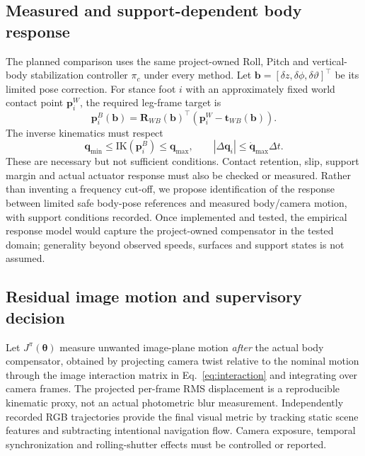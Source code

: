 \subsection{Measured and support-dependent body response}
The planned comparison uses the same project-owned Roll, Pitch and vertical-body stabilization controller $\pi_c$ under every method. Let $\bm b=[\delta z,\delta\phi,\delta\vartheta]^\top$ be its limited pose correction. For stance foot $i$ with an approximately fixed world contact point $\bm p_i^W$, the required leg-frame target is
\begin{equation}\label{eq:stanceanchor}
\bm p_i^B(\bm b)=\bm R_{WB}(\bm b)^\top(\bm p_i^W-\bm t_{WB}(\bm b)).
\end{equation}
The inverse kinematics must respect
\begin{equation}\label{eq:limits}
\bm q_{\min}\le\mathrm{IK}(\bm p_i^B)\le\bm q_{\max},\qquad
|\Delta\bm q_i|\le\dot{\bm q}_{\max}\Delta t.
\end{equation}
These are necessary but not sufficient conditions. Contact retention, slip, support margin and actual actuator response must also be checked or measured. Rather than inventing a frequency cut-off, we propose identification of the response between limited safe body-pose references and measured body/camera motion, with support conditions recorded. Once implemented and tested, the empirical response model would capture the project-owned compensator in the tested domain; generality beyond observed speeds, surfaces and support states is not assumed.

\subsection{Residual image motion and supervisory decision}
Let $J^\pi(\bm\theta)$ measure unwanted image-plane motion \emph{after} the actual body compensator, obtained by projecting camera twist relative to the nominal motion through the image interaction matrix in Eq.~\eqref{eq:interaction} and integrating over camera frames. The projected per-frame RMS displacement is a reproducible kinematic proxy, not an actual photometric blur measurement. Independently recorded RGB trajectories provide the final visual metric by tracking static scene features and subtracting intentional navigation flow. Camera exposure, temporal synchronization and rolling-shutter effects must be controlled or reported.


